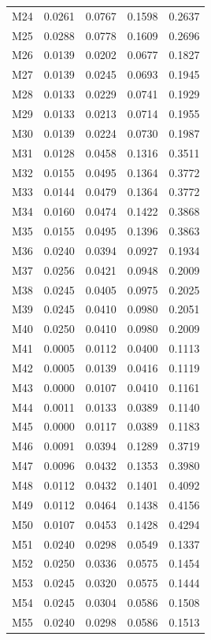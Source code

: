 \begin{longtable}{lrrrr}
M24 & 0.0261 & 0.0767 & 0.1598 & 0.2637 \\
M25 & 0.0288 & 0.0778 & 0.1609 & 0.2696 \\
M26 & 0.0139 & 0.0202 & 0.0677 & 0.1827 \\
M27 & 0.0139 & 0.0245 & 0.0693 & 0.1945 \\
M28 & 0.0133 & 0.0229 & 0.0741 & 0.1929 \\
M29 & 0.0133 & 0.0213 & 0.0714 & 0.1955 \\
M30 & 0.0139 & 0.0224 & 0.0730 & 0.1987 \\
M31 & 0.0128 & 0.0458 & 0.1316 & 0.3511 \\
M32 & 0.0155 & 0.0495 & 0.1364 & 0.3772 \\
M33 & 0.0144 & 0.0479 & 0.1364 & 0.3772 \\
M34 & 0.0160 & 0.0474 & 0.1422 & 0.3868 \\
M35 & 0.0155 & 0.0495 & 0.1396 & 0.3863 \\
M36 & 0.0240 & 0.0394 & 0.0927 & 0.1934 \\
M37 & 0.0256 & 0.0421 & 0.0948 & 0.2009 \\
M38 & 0.0245 & 0.0405 & 0.0975 & 0.2025 \\
M39 & 0.0245 & 0.0410 & 0.0980 & 0.2051 \\
M40 & 0.0250 & 0.0410 & 0.0980 & 0.2009 \\
M41 & 0.0005 & 0.0112 & 0.0400 & 0.1113 \\
M42 & 0.0005 & 0.0139 & 0.0416 & 0.1119 \\
M43 & 0.0000 & 0.0107 & 0.0410 & 0.1161 \\
M44 & 0.0011 & 0.0133 & 0.0389 & 0.1140 \\
M45 & 0.0000 & 0.0117 & 0.0389 & 0.1183 \\
M46 & 0.0091 & 0.0394 & 0.1289 & 0.3719 \\
M47 & 0.0096 & 0.0432 & 0.1353 & 0.3980 \\
M48 & 0.0112 & 0.0432 & 0.1401 & 0.4092 \\
M49 & 0.0112 & 0.0464 & 0.1438 & 0.4156 \\
M50 & 0.0107 & 0.0453 & 0.1428 & 0.4294 \\
M51 & 0.0240 & 0.0298 & 0.0549 & 0.1337 \\
M52 & 0.0250 & 0.0336 & 0.0575 & 0.1454 \\
M53 & 0.0245 & 0.0320 & 0.0575 & 0.1444 \\
M54 & 0.0245 & 0.0304 & 0.0586 & 0.1508 \\
M55 & 0.0240 & 0.0298 & 0.0586 & 0.1513 \\

\end{longtable}
